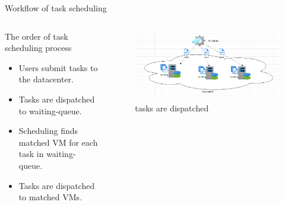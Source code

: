 \documentclass[10pt,xcolor={dvipsnames}, aspectratio=169]{beamer}
\begin{document}
\begin{frame}
{Workflow of task scheduling}
	\begin{columns}[T] %
		\begin{column}{.4\textwidth}
			\begin{block}
			{The order of task scheduling process} 
				\begin{itemize}
					\item Users submit tasks to the datacenter. 
					\item Tasks are dispatched to waiting-queue. 
					\item Scheduling finds matched VM for each task in waiting-queue.
					\item Tasks are dispatched to matched VMs.
				\end{itemize}
			\end{block}
	\end{column}%
	\hfill%
	\begin{column}{.56\textwidth}
		\begin{figure}
			\centering
			\includegraphics[scale=0.4]{images/dispatching.png}
			\caption{tasks are dispatched}
		\end{figure}
	\end{column}%
	\end{columns}
\end{frame}
\end{document}
